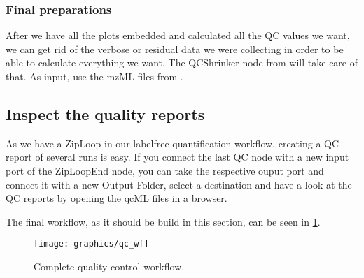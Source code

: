 \subsubsection{Final preparations}
After we have all the plots embedded and calculated all the QC values we want, we can get rid of the verbose or residual data we were collecting in order to be able to calculate everything we want. The QCShrinker node from  will take care of that. As input, use the mzML files from . 


\subsection{Inspect the quality reports}
\label{Inspect the quality reports}

As we have a ZipLoop in our labelfree quantification workflow, creating a QC report of several runs is easy. If you connect the last QC node with a new input port of the ZipLoopEnd node, you can take the respective ouput port and connect it with a new Output Folder, select a destination and have a look at the QC reports by opening the qcML files in a browser. 

The final workflow, as it should be build in this section, can be seen in \cref{fig:qc_wf}.


\begin{figure}[htbp]
  \centering
  \texttt{[image: graphics/qc\_wf]}
  \caption{Complete quality control workflow.}
  \label{fig:qc_wf}
\end{figure}




